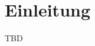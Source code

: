 \documentclass[
	a4paper,				%
	10pt,					%
	oneside,				%
	parskip=half,		%
]{style}						%
\begin{document}
\maketitle %
\frontmatter
\tableofcontents\thispagestyle{toc}
\mainmatter


%

\chapter{Einleitung}
TBD
\end{document}
